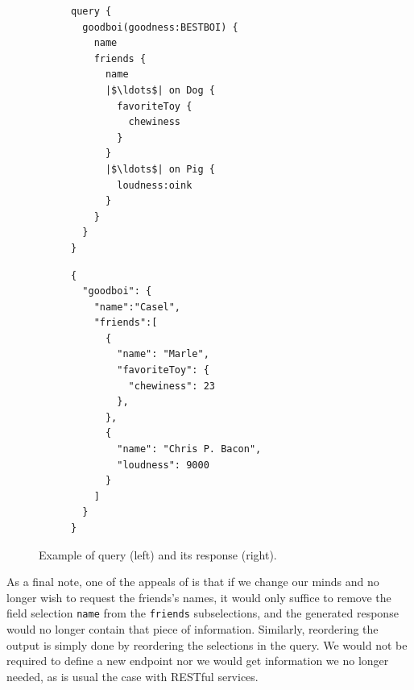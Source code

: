 


\begin{figure}
\centering
\begin{subfigure}{.25\textwidth}
\begin{verbatim}
query {
  goodboi(goodness:BESTBOI) {
    name
    friends {
      name
      |$\ldots$| on Dog {
        favoriteToy {
          chewiness
        }
      }
      |$\ldots$| on Pig {
        loudness:oink
      }
    }
  }
}
\end{verbatim}
\label{fig:query_ex}
\end{subfigure}%
\begin{subfigure}{.25\textwidth}
\begin{verbatim}
{
  "goodboi": {
    "name":"Casel",
    "friends":[
      {
        "name": "Marle",
        "favoriteToy": {
          "chewiness": 23
        },
      },
      {
        "name": "Chris P. Bacon",
        "loudness": 9000
      }
    ]
  }
}
\end{verbatim}
\label{fig:response_ex}
\end{subfigure}

\caption{Example of \gql query (left) and its response (right).}
\label{fig:qres_ex}
\end{figure}

As a final note, one of the appeals of \gql is that if we change our minds and no longer wish to request the friends's names, it would only suffice to remove the field selection 
\texttt{name} from the \texttt{friends} subselections, and the generated response would no longer contain that piece of information. Similarly, reordering the output is simply done
by reordering the selections in the query.
We would not be required to define a new endpoint nor we would get
information we no longer needed, as is usual the case with RESTful
services. 


